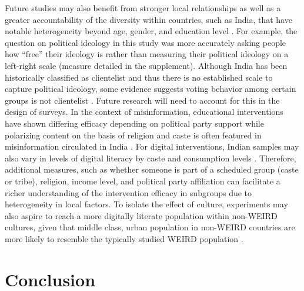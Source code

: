 \documentclass[empirical, authordate, issue]{jote-new-article}
\begin{document}
Future studies may also benefit from stronger local relationships \parencite{Sircar2019} as well as a greater accountability of the diversity within countries, such as India, that have notable heterogeneity beyond age, gender, and education level \parencite{Deshmukh2019}. For example, the question on political ideology in this study was more accurately asking people how “free” their ideology is rather than measuring their political ideology on a left-right scale (measure detailed in the supplement). Although India has been historically classified as clientelist and thus there is no established scale to capture political ideology, some evidence suggests voting behavior among certain groups is not clientelist \parencite{Chibber2018}. Future research will need to account for this in the design of surveys. In the context of misinformation, educational interventions have shown differing efficacy depending on political party support \parencite{Badrinathan2021} while polarizing content on the basis of religion and caste is often featured in misinformation circulated in India \parencite{Al-Zaman2021, Arun2019, Campbell-Smith2019}. For digital interventions, Indian samples may also vary in levels of digital literacy by caste and consumption levels \parencite{Mothkoor2021}. Therefore, additional measures, such as whether someone is part of a scheduled group (caste or tribe), religion, income level, and political party affiliation can facilitate a richer understanding of the intervention efficacy in subgroups due to heterogeneity in local factors. To isolate the effect of culture, experiments may also aspire to reach a more digitally literate population within non-WEIRD cultures, given that middle class, urban population in non-WEIRD countries are more likely to resemble the typically studied WEIRD population \parencite{Ghai2021}.

\section{Conclusion}
\end{document}
